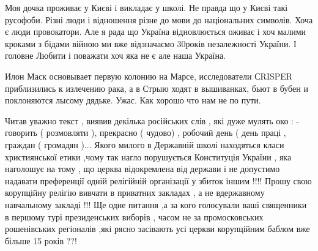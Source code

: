 \begin{itemize}
 

Моя дочка проживає у Києві і викладає у школі. Не правда що у Києві такі
русофоби. Різні люди і відношення різне до мови до національних символів. Хоча
є люди провокатори. Але я рада що Україна відновлюється оживає і хоч малими
кроками з бідами війною ми вже відзначаємо 30років незалежності України. І
головне Любити і поважати хоч яка не є але наша Україна.

 

Илон Маск основывает первую колонию на Марсе, исследователи СRISPER
приблизились к излечению рака, а в Стрыю ходят в вышиванках, бьют в бубен и
поклоняются лысому дядьке. Ужас. Как хорошо что нам не по пути.

 

Читав уважно текст , виявив декілька російських слів , які дуже мулять око : -
говорить ( розмовляти ), прекрасно ( чудово) , робочий день ( день праці ,
граждан ( громадян )...  Якого милого в Державній школі находяться класи
християнської етики ,чому так нагло порушується Конституція України , яка
наголошує на тому , що церква відокремлена від держави і не допустимо надавати
преференції одній релігійній організації у збиток іншим !!!!  Прошу свою
корупційну релігію вивчати в приватних закладах , а не вдержавному навчальному
закладі !!!  Ще одне питання ,а за кого голосували ваші священники в першому
турі президенських виборів , часом не за промосковських рошенівських регіоналів
,які рясно засівають усі церкви корупційним баблом вже більше 15 років ??!

 


\end{itemize}
